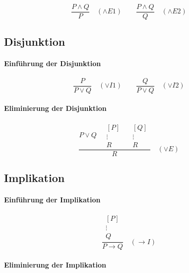 \documentclass{book}
\theoremstyle{plain}
\theoremstyle{remark}
\theoremstyle{definition}
\begin{document}
\[
\frac{P \land Q}{P}
\quad (\land E1)
\qquad
\frac{P \land Q}{Q}
\quad (\land E2)
\]

\subsection{Disjunktion}
\label{sec:lor-rules}

\paragraph{Einführung der Disjunktion}
\label{rule:OI1}\label{rule:OI2}

\[
\frac{P}{P \lor Q}
\quad (\lor I1)
\qquad
\frac{Q}{P \lor Q}
\quad (\lor I2)
\]

\paragraph{Eliminierung der Disjunktion}
\label{rule:OE}

\[
\frac{P \lor Q \quad
   \begin{array}{c}
   [P]\\
   \vdots\\
   R
   \end{array}
   \quad
   \begin{array}{c}
   [Q]\\
   \vdots\\
   R
   \end{array}
}{R}
\quad (\lor E)
\]

\subsection{Implikation}
\label{sec:to-rules}

\paragraph{Einführung der Implikation}
\label{rule:RI}

\[
\frac{
  \begin{array}{c}
    [P]\\
    \vdots\\
    Q
  \end{array}
}{P \to Q}
\quad (\to I)
\]

\paragraph{Eliminierung der Implikation}
\label{rule:RE}
\end{document}
